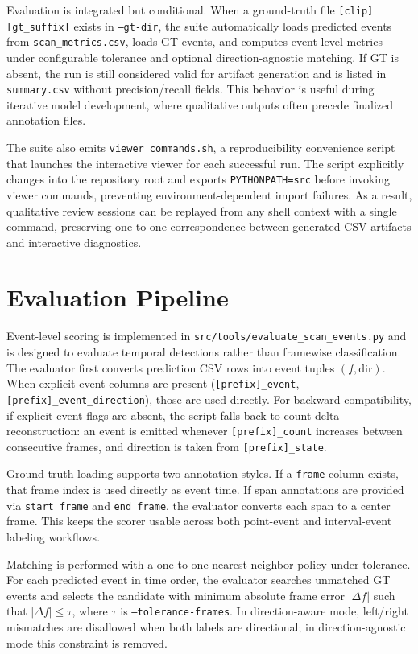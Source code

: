 \documentclass[11pt,a4paper]{article}
\begin{document}
Evaluation is integrated but conditional. When a ground-truth file \texttt{[clip][gt\_suffix]} exists in \texttt{--gt-dir}, the suite automatically loads predicted events from \texttt{scan\_metrics.csv}, loads GT events, and computes event-level metrics under configurable tolerance and optional direction-agnostic matching. If GT is absent, the run is still considered valid for artifact generation and is listed in \texttt{summary.csv} without precision/recall fields. This behavior is useful during iterative model development, where qualitative outputs often precede finalized annotation files.

The suite also emits \texttt{viewer\_commands.sh}, a reproducibility convenience script that launches the interactive viewer for each successful run. The script explicitly changes into the repository root and exports \texttt{PYTHONPATH=src} before invoking viewer commands, preventing environment-dependent import failures. As a result, qualitative review sessions can be replayed from any shell context with a single command, preserving one-to-one correspondence between generated CSV artifacts and interactive diagnostics.

\section{Evaluation Pipeline}
Event-level scoring is implemented in \texttt{src/tools/evaluate\_scan\_events.py} and is designed to evaluate temporal detections rather than framewise classification. The evaluator first converts prediction CSV rows into event tuples \((f,\text{dir})\). When explicit event columns are present (\texttt{[prefix]\_event}, \texttt{[prefix]\_event\_direction}), those are used directly. For backward compatibility, if explicit event flags are absent, the script falls back to count-delta reconstruction: an event is emitted whenever \texttt{[prefix]\_count} increases between consecutive frames, and direction is taken from \texttt{[prefix]\_state}.

Ground-truth loading supports two annotation styles. If a \texttt{frame} column exists, that frame index is used directly as event time. If span annotations are provided via \texttt{start\_frame} and \texttt{end\_frame}, the evaluator converts each span to a center frame. This keeps the scorer usable across both point-event and interval-event labeling workflows.

Matching is performed with a one-to-one nearest-neighbor policy under tolerance. For each predicted event in time order, the evaluator searches unmatched GT events and selects the candidate with minimum absolute frame error \(|\Delta f|\) such that \(|\Delta f| \le \tau\), where \(\tau\) is \texttt{--tolerance-frames}. In direction-aware mode, left/right mismatches are disallowed when both labels are directional; in direction-agnostic mode this constraint is removed.
\end{document}
